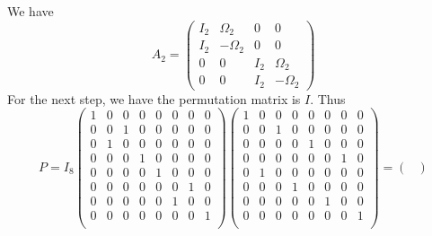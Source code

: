 We have \[
    A_2 = \begin{pmatrix}
        I_2     &\Omega_2   &   0   &   0\\
        I_2     &-\Omega_2  &   0   &   0\\
        0       &   0       &   I_2 &   \Omega_2\\
        0       &   0       &   I_2 &   -\Omega_2
    \end{pmatrix}
\]
For the next step, we have the permutation matrix is $I$. Thus \[
    P = I_8 \begin{pmatrix}
        1   &   0   &   0   &   0   &   0   &   0   &   0   &   0   \\
        0   &   0   &   1   &   0   &   0   &   0   &   0   &   0   \\
        0   &   1   &   0   &   0   &   0   &   0   &   0   &   0   \\
        0   &   0   &   0   &   1   &   0   &   0   &   0   &   0   \\
        0   &   0   &   0   &   0   &   1   &   0   &   0   &   0   \\
        0   &   0   &   0   &   0   &   0   &   0   &   1   &   0   \\
        0   &   0   &   0   &   0   &   0   &   1   &   0   &   0   \\
        0   &   0   &   0   &   0   &   0   &   0   &   0   &   1   \\
    \end{pmatrix}                     
    \begin{pmatrix}
        1   &   0   &   0   &   0   &   0   &   0   &   0   &   0   \\
        0   &   0   &   1   &   0   &   0   &   0   &   0   &   0   \\
        0   &   0   &   0   &   0   &   1   &   0   &   0   &   0   \\
        0   &   0   &   0   &   0   &   0   &   0   &   1   &   0   \\
        0   &   1   &   0   &   0   &   0   &   0   &   0   &   0   \\
        0   &   0   &   0   &   1   &   0   &   0   &   0   &   0   \\
        0   &   0   &   0   &   0   &   0   &   1   &   0   &   0   \\
        0   &   0   &   0   &   0   &   0   &   0   &   0   &   1   \\
    \end{pmatrix} = \begin{pmatrix}

\end{pmatrix}\]

